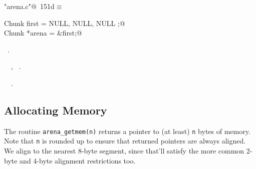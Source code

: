 \documentclass[a4paper]{report}
\begin{document}
\begin{flushleft} \small
\begin{minipage}{\linewidth}\label{scrap339}\raggedright\small
{} \verb@"arena.c"@\nobreak\ {\footnotesize {151d}}$\equiv$
\vspace{-1ex}
\begin{list}{}{} \item
\mbox{}\verb@static Chunk first = { NULL, NULL, NULL };@\\
\mbox{}\verb@static Chunk *arena = &first;@\\
\mbox{}\verb@@{\NWsep}
\end{list}
\vspace{-1.5ex}
\footnotesize
\begin{list}{}{\setlength{\itemsep}{-\parsep}\setlength{\itemindent}{-\leftmargin}}
\item \NWtxtFileDefBy\ .
\item \NWtxtIdentsDefed\nobreak\  \verb@arena@\nobreak\ , \verb@first@\nobreak\ .\item \NWtxtIdentsUsed\nobreak\  \verb@Chunk@\nobreak\ .
\item{}
\end{list}
\end{minipage}\vspace{4ex}
\end{flushleft}
\subsection{Allocating Memory}

The routine \verb|arena_getmem(n)| returns a pointer to (at least)
\verb|n| bytes of memory. Note that \verb|n| is rounded up to ensure
that returned pointers are always aligned.  We align to the nearest
8-byte segment, since that'll satisfy the more common 2-byte and
4-byte alignment restrictions too.
\end{document}
